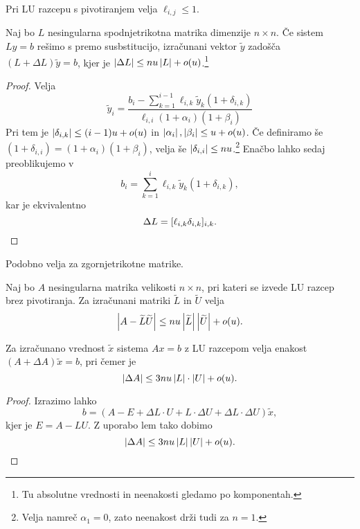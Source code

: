 \begin{opomba}
Pri LU razcepu s pivotiranjem velja $\ell_{i,j} \leq 1$.
\end{opomba}

\begin{lema}
Naj bo $L$ nesingularna spodnjetrikotna matrika dimenzije
$n \times n$. Če sistem $Ly = b$ rešimo s premo susbstitucijo,
izračunani vektor $\tilde{y}$ zadošča
$(L + \Delta L) \tilde{y} = b$, kjer je
$\left\lvert \Delta L\right\rvert \leq nu \left\lvert L\right\rvert + o(u)$.\footnote{Tu absolutne
vrednosti in neenakosti gledamo po komponentah.}
\end{lema}

\begin{proof}
Velja
\[
\tilde{y}_i =
\frac{\displaystyle b_i -
\sum_{k=1}^{i-1} \ell_{i,k} \tilde{y}_k (1 + \delta_{i,k})}
{\ell_{i,i} (1 + \alpha_i) (1 + \beta_i)}
\]
Pri tem je $\left\lvert \delta_{i,k}\right\rvert \leq (i-1) u + o(u)$ in
$\left\lvert \alpha_i\right\rvert, \left\lvert \beta_i\right\rvert \leq u + o(u)$. Če definiramo še
$(1 + \delta_{i,i}) = (1 + \alpha_i) (1 + \beta_i)$, velja še
$\left\lvert \delta_{i,i}\right\rvert \leq nu$.\footnote{Velja namreč
$\alpha_1 = 0$, zato neenakost drži tudi za $n=1$.} Enačbo lahko
sedaj preoblikujemo v
\[
b_i = \sum_{k=1}^i \ell_{i,k} \tilde{y}_k (1 + \delta_{i,k}),
\]
kar je ekvivalentno
\[
\Delta L = [\ell_{i,k} \delta_{i,k}]_{i,k}. \qedhere
\]
\end{proof}

\begin{opomba}
Podobno velja za zgornjetrikotne matrike.
\end{opomba}

\begin{lema}
Naj bo $A$ nesingularna matrika velikosti $n \times n$, pri kateri
se izvede LU razcep brez pivotiranja. Za izračunani matriki
$\widetilde{L}$ in $\widetilde{U}$ velja
\[
\left\lvert A - \widetilde{L} \widetilde{U}\right\rvert \leq
n u \left\lvert \widetilde{L}\right\rvert \left\lvert \widetilde{U}\right\rvert + o(u).
\]
\end{lema}

\begin{izrek}
Za izračunano vrednost $\tilde{x}$ sistema $Ax = b$ z LU razcepom
velja enakost $(A + \Delta A) \tilde{x} = b$, pri čemer je
\[
\left\lvert \Delta A\right\rvert \leq 3 n u \left\lvert L\right\rvert \cdot \left\lvert U\right\rvert + o(u).
\]
\end{izrek}

\begin{proof}
Izrazimo lahko
\[
b = (A - E + \Delta L \cdot U + L \cdot \Delta U +
\Delta L \cdot \Delta U) \tilde{x},
\]
kjer je $E = A - LU$. Z uporabo lem tako dobimo
\[
\left\lvert \Delta A\right\rvert \leq 3 nu \left\lvert L\right\rvert \left\lvert U\right\rvert + o(u). \qedhere
\]
\end{proof}

